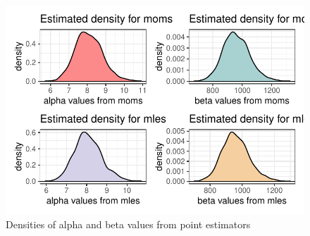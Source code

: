 \documentclass{article}\usepackage[]{graphicx}\usepackage[]{xcolor}
\makeatletter
\def\maxwidth{ %
  \ifdim\Gin@nat@width>\linewidth
    \linewidth
  \else
    \Gin@nat@width
  \fi
}
\newenvironment{knitrout}{}{} %
\makeatother
\begin{document}
\begin{multicols}{2}
\begin{figure}[H]
\begin{center}
\begin{knitrout}
\color{fgcolor}
\includegraphics[width=\maxwidth]{figure/unnamed-chunk-8-1} 
\end{knitrout}
\caption{Densities of alpha and beta values from point estimators}
\label{plot4} 
\end{center}
\end{figure}


\end{multicols}
\end{document}
